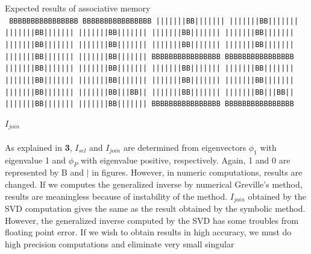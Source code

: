 \begin{center}
{\large Expected results of associative memory \\[1em]}
\tt\offinterlineskip\obeylines
BBBBBBBBBBBBBBBB \hspace{5em} BBBBBBBBBBBBBBBB
|||||||BB||||||| \hspace{5em} |||||||BB|||||||
|||||||BB||||||| \hspace{5em} |||||||BB||||||| 
|||||||BB||||||| \hspace{5em} |||||||BB|||||||
|||||||BB||||||| \hspace{5em} |||||||BB|||||||
|||||||BB||||||| \hspace{5em} |||||||BB|||||||   
|||||||BB||||||| \hspace{5em} |||||||BB|||||||
BBBBBBBBBBBBBBBB \hspace{5em} BBBBBBBBBBBBBBBB
|||||||BB||||||| \hspace{5em} |||||||BB|||||||
|||||||BB||||||| \hspace{5em} |||||||BB|||||||
|||||||BB||||||| \hspace{5em} |||||||BB|||||||
|||||||BB||||||| \hspace{5em} |||||||BB|||||||
|||||||BB||||||| \hspace{5em} |||||||BB|||BB||
|||||||BB||||||| \hspace{5em} |||||||BB|||BB||
|||||||BB||||||| \hspace{5em} |||||||BB|||||||
BBBBBBBBBBBBBBBB \hspace{5em} BBBBBBBBBBBBBBBB
\end{center}
 \hspace{11em} 
{\large $I_{join} $ } \\
\ \\
As explained in {\bf 3}, $I_{sel} $ and $I_{join} $ are determined 
from eigenvectors $\phi_1 $ with eigenvalue 1
and $\phi_P $ with eigenvalue positive, respectively.
Again, 1 and 0 are represented by B and $\mid $ in figures.  
However, in numeric computations, 
results are changed.  If we computes the generalized 
inverse by numerical Greville's method, results 
are meaningless because of instability of the 
method.  $I_{join} $ obtained by the 
SVD computation gives the same as the result 
obtained by the symbolic method.  However, the 
generalized inverse computed by the SVD has some 
troubles from floating point error.  
If we wish to obtain results in high accuracy, we must do 
high precision computations and eliminate very small singular 
